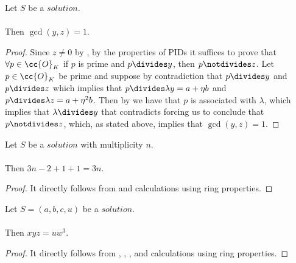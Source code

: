 \begin{lemma}
  \label{lmm:coprime_y_z}
  \leanok
  Let $S$ be a $solution$.\\\\
  Then $\gcd(y, z) = 1$.
\end{lemma}
\begin{proof}
  \leanok
  Since $z \neq 0$ by , by the properties of PIDs it suffices to prove that
  $\forall p \in \cc{O}_K$ if $p$ is prime and $p \divides y$, then $p \notdivides z$.
  Let $p \in \cc{O}_K$ be prime and suppose by contradiction that $p \divides y$ and $p \divides z$
  which implies that $p \divides \lambda y = a+\eta b$ and $p \divides \lambda z = a + \eta^2 b$.
  Then by 
  we have that $p$ is associated with $\lambda$, which implies that $\lambda \divides y$
  that contradicts  forcing us to conclude that $p \notdivides z$, which,
  as stated above, implies that $\gcd(y,z)=1$.
\end{proof}

\begin{lemma}
  \label{lmm:mult_minus_two_plus_one_plus_one}
  \leanok
  Let $S$ be a $solution$ with multiplicity $n$.\\\\
  Then $3n - 2 + 1 + 1 = 3n$.
\end{lemma}
\begin{proof}
  \leanok
  It directly follows from 
  and calculations using ring properties.
\end{proof}

\begin{lemma}
  \label{lmm:x_mul_y_mul_z_eq_u_w_pow_three}
  \leanok
  Let $S=(a,b,c,u)$ be a $solution$.\\\\
  Then $x y z = u w^3$.
\end{lemma}
\begin{proof}
  \leanok
  It directly follows from , ,
  ,  and
  calculations using ring properties.
\end{proof}

